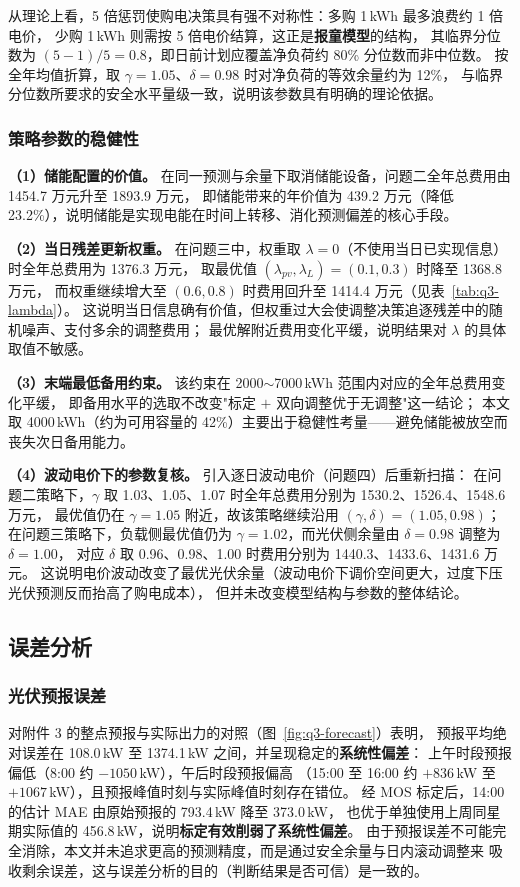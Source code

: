 从理论上看，5 倍惩罚使购电决策具有强不对称性：多购 1\,kWh 最多浪费约 1 倍电价，
少购 1\,kWh 则需按 5 倍电价结算，这正是\textbf{报童模型}的结构，
其临界分位数为 $(5-1)/5=0.8$，即日前计划应覆盖净负荷约 80\% 分位数而非中位数。
按全年均值折算，取 $\gamma=1.05$、$\delta=0.98$ 时对净负荷的等效余量约为 12\%，
与临界分位数所要求的安全水平量级一致，说明该参数具有明确的理论依据。

\subsubsection{策略参数的稳健性}
\textbf{（1）储能配置的价值。} 在同一预测与余量下取消储能设备，问题二全年总费用由 1454.7 万元升至 1893.9 万元，
即储能带来的年价值为 439.2 万元（降低 23.2\%），说明储能是实现电能在时间上转移、消化预测偏差的核心手段。

\textbf{（2）当日残差更新权重。} 在问题三中，权重取 $\lambda=0$（不使用当日已实现信息）时全年总费用为 1376.3 万元，
取最优值 $(\lambda_{pv},\lambda_L)=(0.1,0.3)$ 时降至 1368.8 万元，
而权重继续增大至 $(0.6,0.8)$ 时费用回升至 1414.4 万元（见表~\ref{tab:q3-lambda}）。
这说明当日信息确有价值，但权重过大会使调整决策追逐残差中的随机噪声、支付多余的调整费用；
最优解附近费用变化平缓，说明结果对 $\lambda$ 的具体取值不敏感。

\textbf{（3）末端最低备用约束。} 该约束在 2000$\sim$7000\,kWh 范围内对应的全年总费用变化平缓，
即备用水平的选取不改变"标定 $+$ 双向调整优于无调整"这一结论；
本文取 4000\,kWh（约为可用容量的 42\%）主要出于稳健性考量——避免储能被放空而丧失次日备用能力。

\textbf{（4）波动电价下的参数复核。} 引入逐日波动电价（问题四）后重新扫描：
在问题二策略下，$\gamma$ 取 1.03、1.05、1.07 时全年总费用分别为 1530.2、1526.4、1548.6 万元，
最优值仍在 $\gamma=1.05$ 附近，故该策略继续沿用 $(\gamma,\delta)=(1.05,0.98)$；
在问题三策略下，负载侧最优值仍为 $\gamma=1.02$，而光伏侧余量由 $\delta=0.98$ 调整为 $\delta=1.00$，
对应 $\delta$ 取 0.96、0.98、1.00 时费用分别为 1440.3、1433.6、1431.6 万元。
这说明电价波动改变了最优光伏余量（波动电价下调价空间更大，过度下压光伏预测反而抬高了购电成本），
但并未改变模型结构与参数的整体结论。

\subsection{误差分析}

\subsubsection{光伏预报误差}
对附件 3 的整点预报与实际出力的对照（图~\ref{fig:q3-forecast}）表明，
预报平均绝对误差在 108.0\,kW 至 1374.1\,kW 之间，并呈现稳定的\textbf{系统性偏差}：
上午时段预报偏低（8:00 约 $-1050$\,kW），午后时段预报偏高
（15:00 至 16:00 约 $+836$\,kW 至 $+1067$\,kW），且预报峰值时刻与实际峰值时刻存在错位。
经 MOS 标定后，14:00 的估计 MAE 由原始预报的 793.4\,kW 降至 373.0\,kW，
也优于单独使用上周同星期实际值的 456.8\,kW，说明\textbf{标定有效削弱了系统性偏差}。
由于预报误差不可能完全消除，本文并未追求更高的预测精度，而是通过安全余量与日内滚动调整来
吸收剩余误差，这与误差分析的目的（判断结果是否可信）是一致的。

